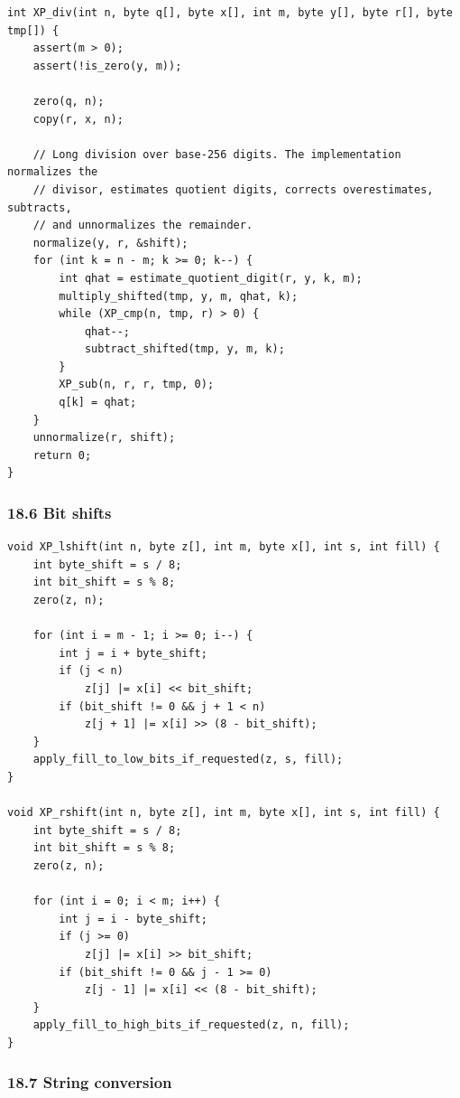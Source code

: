 \documentclass[11pt]{article}
\begin{document}
\begin{verbatim}
int XP_div(int n, byte q[], byte x[], int m, byte y[], byte r[], byte tmp[]) {
    assert(m > 0);
    assert(!is_zero(y, m));

    zero(q, n);
    copy(r, x, n);

    // Long division over base-256 digits. The implementation normalizes the
    // divisor, estimates quotient digits, corrects overestimates, subtracts,
    // and unnormalizes the remainder.
    normalize(y, r, &shift);
    for (int k = n - m; k >= 0; k--) {
        int qhat = estimate_quotient_digit(r, y, k, m);
        multiply_shifted(tmp, y, m, qhat, k);
        while (XP_cmp(n, tmp, r) > 0) {
            qhat--;
            subtract_shifted(tmp, y, m, k);
        }
        XP_sub(n, r, r, tmp, 0);
        q[k] = qhat;
    }
    unnormalize(r, shift);
    return 0;
}
\end{verbatim}

\subsubsection{18.6 Bit shifts}\label{bit-shifts}

\begin{verbatim}
void XP_lshift(int n, byte z[], int m, byte x[], int s, int fill) {
    int byte_shift = s / 8;
    int bit_shift = s % 8;
    zero(z, n);

    for (int i = m - 1; i >= 0; i--) {
        int j = i + byte_shift;
        if (j < n)
            z[j] |= x[i] << bit_shift;
        if (bit_shift != 0 && j + 1 < n)
            z[j + 1] |= x[i] >> (8 - bit_shift);
    }
    apply_fill_to_low_bits_if_requested(z, s, fill);
}

void XP_rshift(int n, byte z[], int m, byte x[], int s, int fill) {
    int byte_shift = s / 8;
    int bit_shift = s % 8;
    zero(z, n);

    for (int i = 0; i < m; i++) {
        int j = i - byte_shift;
        if (j >= 0)
            z[j] |= x[i] >> bit_shift;
        if (bit_shift != 0 && j - 1 >= 0)
            z[j - 1] |= x[i] << (8 - bit_shift);
    }
    apply_fill_to_high_bits_if_requested(z, n, fill);
}
\end{verbatim}

\subsubsection{18.7 String conversion}\label{string-conversion}
\end{document}
